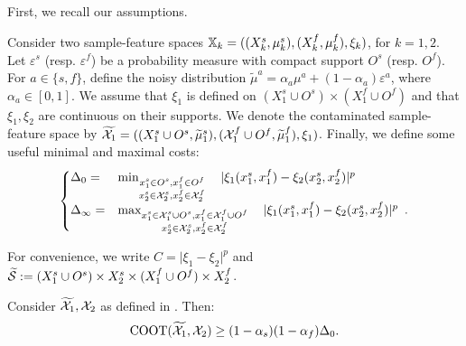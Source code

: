First, we recall our assumptions.
\begin{assumption}
\label{assump:robust_copy}
Consider two sample-feature spaces
$\mathbb X_k = ((X^s_k, \mu^s_k), (X^f_k, \mu^f_k), \xi_k)$, for $k=1,2$.
Let $\varepsilon^s$ (resp. $\varepsilon^f$) be a probability measure with compact support $O^s$
(resp. $O^f$). For $a \in \{s, f\}$, define the noisy distribution
$\widetilde{\mu}^a = \alpha_a \mu^a + (1-\alpha_a) \varepsilon^a$, where $\alpha_a \in [0,1]$.
We assume that $\xi_1$ is defined on
$(X^s_1 \cup O^s) \times (X^f_1 \cup O^f)$ and that $\xi_1, \xi_2$
are continuous on their supports. We denote the contaminated sample-feature space by
$\widetilde{\mathcal X_1} = ((X^s_1 \cup O^s, \widetilde{\mu}^s_1),
(\mathcal X^f_1 \cup O^f, \widetilde{\mu}^f_1), \xi_1)$. Finally,
we define some useful minimal and maximal costs:
  \[
  \begin{cases}
  \Delta_{0} =& \min_{
  \substack{
       x_1^s \in O^s, x_1^f \in O^f  \\
       x_2^s \in \mathcal X_2^s, x_2^f \in \mathcal X_2^f
  }}\quad |\xi_1(x_1^s, x_1^f) - \xi_2(x_2^s, x_2^f)|^p \\
  \Delta_{\infty} =& \max_{
  \substack{
  x_1^s \in \mathcal X_1^s \cup O^s, x_1^f \in \mathcal X_1^f \cup O^f \\
  x_2^s \in \mathcal X_2^s, x_2^f \in \mathcal X_2^f
  }} \quad|\xi_1(x_1^s, x_1^f) - \xi_2(x_2^s, x_2^f)|^p \enspace.
  \end{cases}
\]
\end{assumption}
For convenience, we write $C = \vert \xi_1 - \xi_2 \vert^p$ and
$\widetilde{\mathcal S} := (X^s_1 \cup O^s) \times X_2^s \times (X^f_1 \cup O^f) \times X_2^f$.
\begin{proposition}
Consider $\widetilde{\mathcal X_1}, \mathcal X_2$ as defined in .
Then:
 \label{prop:coot-not-robust_copy}
\begin{equation}
    \text{COOT}(\widetilde{\mathcal X_1}, \mathcal X_2) \geq (1 - \alpha_s)(1-\alpha_f) \Delta_0.
\end{equation}
\end{proposition}
